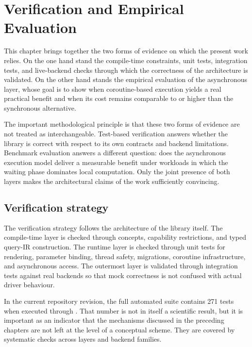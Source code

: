 \section{Verification and Empirical Evaluation}
\label{sec:verification_evaluation}

This chapter brings together the two forms of evidence on which the present work relies. On the one hand stand the compile-time constraints, unit tests, integration tests, and live-backend checks through which the correctness of the architecture is validated. On the other hand stands the empirical evaluation of the asynchronous layer, whose goal is to show when coroutine-based execution yields a real practical benefit and when its cost remains comparable to or higher than the synchronous alternative.

The important methodological principle is that these two forms of evidence are not treated as interchangeable. Test-based verification answers whether the library is correct with respect to its own contracts and backend limitations. Benchmark evaluation answers a different question: does the asynchronous execution model deliver a measurable benefit under workloads in which the waiting phase dominates local computation. Only the joint presence of both layers makes the architectural claims of the work sufficiently convincing.

\subsection{Verification strategy}

The verification strategy follows the architecture of the library itself. The compile-time layer is checked through concepts, capability restrictions, and typed query-IR construction. The runtime layer is checked through unit tests for rendering, parameter binding, thread safety, migrations, coroutine infrastructure, and asynchronous access. The outermost layer is validated through integration tests against real backends so that mock correctness is not confused with actual driver behaviour.

In the current repository revision, the full automated suite contains 271 tests when executed through . That number is not in itself a scientific result, but it is important as an indicator that the mechanisms discussed in the preceding chapters are not left at the level of a conceptual scheme. They are covered by systematic checks across layers and backend families.

